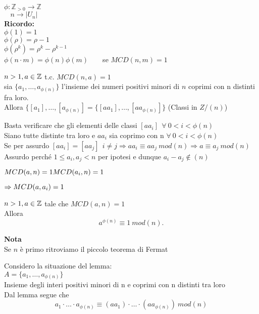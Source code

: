 \documentclass[12px]{article}
\begin{document}
{	%
	$\phi: \mathbb Z_{>0} \rightarrow \mathbb Z$\\
	$\text{} \ \ \ \ n \rightarrow |U_n|$\\
	\textbf{Ricordo:}\\
	$\phi(1) = 1$\\
	 $\phi(\rho) = \rho -1$\\
	 $\phi(\rho^k) = \rho^k - \rho ^{k-1}$\\
	 $\phi(n\cdot m) = \phi(n)\phi(m)$\ \ \ \ se  $MCD(n,m) = 1$\\
	  \begin{lemm}
	 	$n>1, a\in\mathbb{Z}$ t.c.  $MCD(n,a) = 1$\\
		sia  $\{a_1,\ldots,a_{\phi(n)}\}$ l'insieme dei numeri positivi minori di $n$ coprimi con n distinti fra loro.\\
		Allora $\{[a_1],\ldots,[a_{\phi(n)}] = \{[aa_1],\ldots, [aa_{\phi(n)}]\}$ (Classi in $Z/(n)$)
	 \end{lemm}
	 \begin{dimo}
		 Basta verificare che gli elementi delle classi $[aa_i] \ \ \forall \ 0<i<\phi(n)$\\
		 Siano tutte distinte tra loro e  $aa_i$ sia coprimo con n  $\forall \ 0<i<\phi(n)$ \\
		 Se per assurdo $[aa_i] = [aa_j] \ \ i\neq j \Rightarrow aa_i\equiv aa_j\  mod(n) \Rightarrow a\equiv a_j \ mod(n)$ Assurdo perché $1\leq a_i, a_j< n$ per ipotesi e dunque  $a_i-a_j\not\in (n)$\\
		 \begin{cases}
		  $MCD(a,n) = 1 \\ MCD(a_i,n) = 1$
		 \end{cases} $\Rightarrow MCD(a,a_i) = 1\\$
	 \end{dimo}
	 \begin{teo}[Eulero 1760]
	 	$n>1 ,a\in\mathbb{Z}$ tale che $MCD(a,n) = 1$\\
		Allora
		 \[
			 a^{\phi(n)}\equiv 1\  mod(n)
		.\] 
	 \end{teo}
	 \textbf{Nota}\\
	 Se $n$ è primo ritroviamo il piccolo teorema di Fermat
	 \begin{dimo}
	 	Considero la situazione del lemma:\\
		$A = \{a_1,\ldots,a_{\phi(n)}\}$\\
			Insieme degli interi positivi minori di n e coprimi con n distinti tra loro\\
			Dal lemma segue che
			\[
				a_1\cdot\ldots\cdot a_{\phi(n)}\equiv (aa_1)\cdot\ldots\cdot (aa_{\phi(n)}) \ mod(n)
\]
\end{dimo}}
\end{document}
